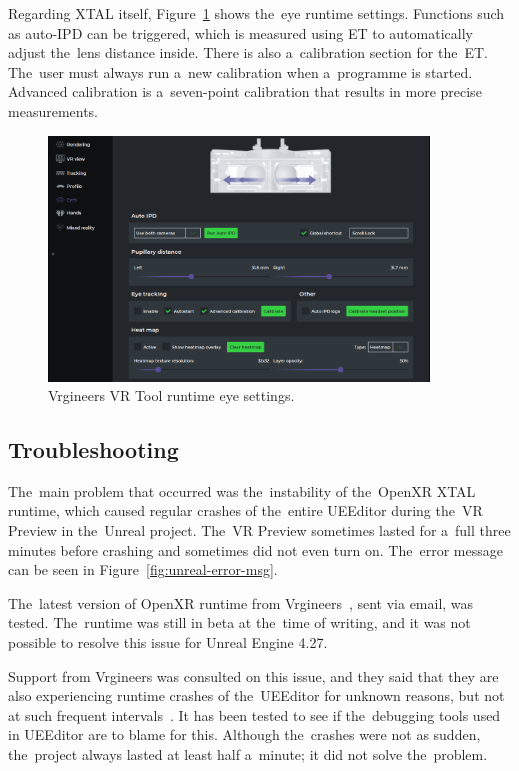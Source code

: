Regarding XTAL itself, Figure~\ref{fig:vr-tools-settings} shows the~eye runtime settings. Functions such as auto-IPD can be triggered, which is measured using ET to automatically adjust the~lens distance inside. There is also a~calibration section for the~ET. The~user must always run a~new calibration when a~programme is started. Advanced calibration is a~seven-point calibration that results in more precise measurements. 

\begin{figure}[!ht]\centering
    \includegraphics[width=0.9\textwidth]{img/runtime-eye-settings.png}
    \caption{Vrgineers VR Tool runtime eye settings.~\cite{vr-tool}}
    \label{fig:vr-tools-settings}
\end{figure}

\subsection{Troubleshooting}

The~main problem that occurred was the~instability of the~OpenXR XTAL runtime, which caused regular crashes of the~entire UEEditor during the~VR Preview in the~Unreal project. The~VR Preview sometimes lasted for a~full three minutes before crashing and sometimes did not even turn on. The~error message can be seen in Figure~\ref{fig:unreal-error-msg}.

\pagebreak{}
The~latest version of OpenXR runtime from Vrgineers~\cite{vrgineers-openxr-soft}, sent via email, was tested. The~runtime was still in beta at the~time of writing, and it was not possible to resolve this issue for Unreal Engine 4.27.

Support from Vrgineers was consulted on this issue, and they said that they are also experiencing runtime crashes of the~UEEditor for unknown reasons, but not at such frequent intervals~\cite{vrginners-email}. It has been tested to see if the~debugging tools used in UEEditor are to blame for this. Although the~crashes were not as sudden, the~project always lasted at least half a~minute; it did not solve the~problem.

